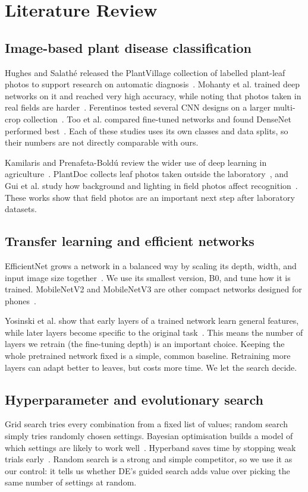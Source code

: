 \chapter{Literature Review}
\section{Image-based plant disease classification}
Hughes and Salathé released the PlantVillage collection of labelled plant-leaf photos to support research on automatic diagnosis~\cite{hughes2015dataset}. Mohanty et al. trained deep networks on it and reached very high accuracy, while noting that photos taken in real fields are harder~\cite{mohanty2016plant}. Ferentinos tested several CNN designs on a larger multi-crop collection~\cite{ferentinos2018plant}. Too et al. compared fine-tuned networks and found DenseNet performed best~\cite{too2019plant}. Each of these studies uses its own classes and data splits, so their numbers are not directly comparable with ours.

Kamilaris and Prenafeta-Boldú review the wider use of deep learning in agriculture~\cite{kamilaris2018survey}. PlantDoc collects leaf photos taken outside the laboratory~\cite{singh2020plantdoc}, and Gui et al. study how background and lighting in field photos affect recognition~\cite{gui2021field}. These works show that field photos are an important next step after laboratory datasets.

\section{Transfer learning and efficient networks}
EfficientNet grows a network in a balanced way by scaling its depth, width, and input image size together~\cite{tan2019efficientnet}. We use its smallest version, B0, and tune how it is trained. MobileNetV2 and MobileNetV3 are other compact networks designed for phones~\cite{sandler2018mobilenet,howard2019mobilenet}.

Yosinski et al. show that early layers of a trained network learn general features, while later layers become specific to the original task~\cite{yosinski2014transfer}. This means the number of layers we retrain (the fine-tuning depth) is an important choice. Keeping the whole pretrained network fixed is a simple, common baseline. Retraining more layers can adapt better to leaves, but costs more time. We let the search decide.

\section{Hyperparameter and evolutionary search}
Grid search tries every combination from a fixed list of values; random search simply tries randomly chosen settings. Bayesian optimisation builds a model of which settings are likely to work well~\cite{snoek2012bayesian}. Hyperband saves time by stopping weak trials early~\cite{li2016hyperband}. Random search is a strong and simple competitor, so we use it as our control: it tells us whether DE's guided search adds value over picking the same number of settings at random.

